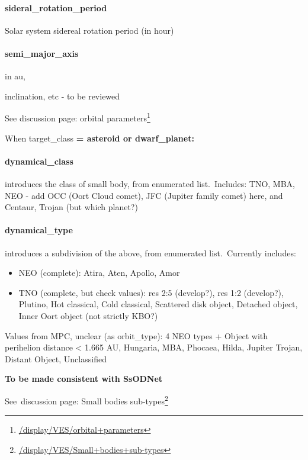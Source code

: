 \documentclass[11pt,a4paper]{ivoa}
\begin{document}
\paragraph{sideral\_rotation\_period}

Solar system sidereal rotation period (in hour)

\paragraph{semi\_major\_axis}

in au,

inclination, etc - to be reviewed

See discussion page: orbital parameters\footnote{\url{/display/VES/orbital+parameters}}

When target\_class\textbf{ = asteroid or dwarf\_planet:\\}

\paragraph{dynamical\_class}

introduces the class of small body, from enumerated list. Includes: TNO, MBA, NEO - add OCC (Oort Cloud comet), JFC (Jupiter family comet) here, and Centaur, Trojan (but which planet?)

\paragraph{dynamical\_type}

introduces a subdivision of the above, from enumerated list. Currently includes:

\begin{itemize}
\item NEO (complete): Atira, Aten, Apollo, Amor
\item TNO (complete, but check values): res 2:5 (develop?), res 1:2 (develop?), Plutino, Hot classical, Cold classical, Scattered disk object, Detached object, Inner Oort object (not strictly KBO?)
\end{itemize}

Values from MPC, unclear (as orbit\_type): 4 NEO types + Object with perihelion distance < 1.665 AU, Hungaria, MBA, Phocaea, Hilda, Jupiter Trojan, Distant Object, Unclassified

\textbf{To be made consistent with SsODNet\emph{\\}}

See discussion page: Small bodies sub-types\footnote{\url{/display/VES/Small+bodies+sub-types}}
\end{document}

